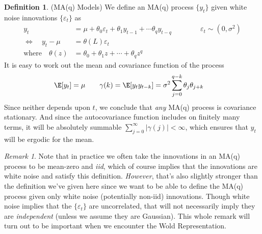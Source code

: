 \documentclass[12pt]{article}
\theoremstyle{plain}
\theoremstyle{definition}
\newtheorem{defn}[thm]{Definition}
\theoremstyle{remark}
\newtheorem*{rmk}{Remark}
\begin{document}
\begin{defn}(MA(q) Models)
We define an MA(q) process $\{y_t\}$ given white noise innovations
$\{\varepsilon_t\}$ as
\begin{align*}
  y_t &= \mu + \theta_0\varepsilon_t + \theta_1y_{t-1} + \cdots \theta_qy_{t-q}
  \qquad\qquad \varepsilon_t\sim(0,\sigma^2)
  \\
  \iff\quad
  y_t - \mu
  &= \theta(L) \varepsilon_t
  \\
  \text{where}\quad
  \theta(z) &= \theta_0 + \theta_1z + \cdots + \theta_qz^q
\end{align*}
It is easy to work out the mean and covariance function of the process
\begin{align*}
  \E[y_t] = \mu
  \qquad
  \gamma(k) = \E[y_ty_{t-k}] &=
    \sigma^2 \sum_{j=0}^{q-k} \theta_j \theta_{j+k}
\end{align*}
Since neither depends upon $t$, we conclude that \emph{any} MA(q)
process is covariance stationary. And since the autocovariance function
includes on finitely many terms, it will be absolutely summable
$\sum_{j=0}^\infty |\gamma(j)|<\infty$, which ensures that $y_t$ will be
ergodic for the mean.
\end{defn}
\begin{rmk}
Note that in practice we often take the innovations in an MA(q) process
to be mean-zero and \emph{iid}, which of course implies that the
innovations are white noise and satisfy this definition. \emph{However},
that's also slightly stronger than the definition we've given here since
we want to be able to define the MA(q) process given only white noise
(potentially non-iid) innovations.  Though white noise implies that the
$\{\varepsilon_t\}$ are uncorrelated, that will not necessarily imply
they are \emph{independent} (unless we assume they are Gaussian). This
whole remark will turn out to be important when we encounter the Wold
Representation.
\end{rmk}
\end{document}
